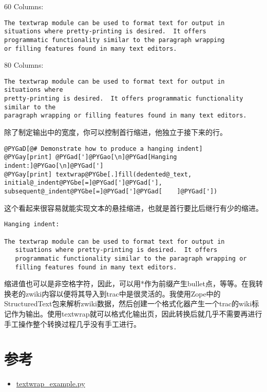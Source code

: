 \documentclass[a4paper,10pt,english]{manual}
\begin{document}
60 Columns:

\begin{Verbatim}[commandchars=@\[\]]
The textwrap module can be used to format text for output in
situations where pretty-printing is desired.  It offers
programmatic functionality similar to the paragraph wrapping
or filling features found in many text editors.
\end{Verbatim}

80 Columns:

\begin{Verbatim}[commandchars=@\[\]]
The textwrap module can be used to format text for output in situations where
pretty-printing is desired.  It offers programmatic functionality similar to the
paragraph wrapping or filling features found in many text editors.
\end{Verbatim}

除了制定输出中的宽度，你可以控制首行缩进，他独立于接下来的行。

\begin{Verbatim}[commandchars=@\[\]]
@PYGaD[@# Demonstrate how to produce a hanging indent]
@PYGay[print] @PYGad[']@PYGao[\n]@PYGad[Hanging indent:]@PYGao[\n]@PYGad[']
@PYGay[print] textwrap@PYGbe[.]fill(dedented@_text, initial@_indent@PYGbe[=]@PYGad[']@PYGad['], subsequent@_indent@PYGbe[=]@PYGad[']@PYGad[    ]@PYGad['])
\end{Verbatim}

这个看起来很容易就能实现文本的悬挂缩进，也就是首行要比后继行有少的缩进。

\begin{Verbatim}[commandchars=@\[\]]
Hanging indent:

The textwrap module can be used to format text for output in
   situations where pretty-printing is desired.  It offers
   programmatic functionality similar to the paragraph wrapping or
   filling features found in many text editors.
\end{Verbatim}

缩进值也可以是非空格字符，因此，可以用*作为前缀产生bullet点，等等。在我转换老的zwiki内容以便将其导入到trac中是很灵活的。我使用Zope中的StructuredText包来解析zwiki数据，然后创建一个格式化器产生一个trac的wiki标记作为输出。使用textwrap就可以格式化输出页，因此转换后就几乎不需要再进行手工操作整个转换过程几乎没有手工进行。


\section{参考}
\begin{itemize}
\item {} 
\href{http://www.doughellmann.com/PyMOTW/textwrap\_example.py}{textwrap\_example.py}

\end{itemize}
\end{document}
